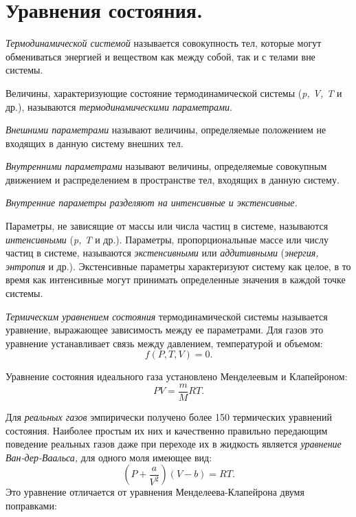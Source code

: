 \chapter{Уравнения состояния.} \label{equationOfState}

\emph{Термодинамической системой} называется совокупность тел, которые
могут обмениваться энергией и веществом как между собой, так и с телами
вне системы.

Величины, характеризующие состояние термодинамической системы (\emph{p,
V, T} и др.), называются \emph{термодинамическими параметрами}.

\emph{Внешними параметрами} называют величины, определяемые положением
не входящих в данную систему внешних тел.

\emph{Внутренними параметрами} называют величины, определяемые
совокупным движением и распределением в пространстве тел, входящих в
данную систему.

\emph{Внутренние параметры разделяют на интенсивные и экстенсивные.}

Параметры, не зависящие от массы или числа частиц в системе, называются
\emph{интенсивными} (\emph{p, T} и др.). Параметры, пропорциональные массе или числу частиц в системе, называются \emph{экстенсивными} или \emph{аддитивными} (\emph{энергия, энтропия} и др.). Экстенсивные параметры характеризуют систему как целое, в то время как интенсивные могут принимать определенные значения в каждой точке системы.

\emph{Термическим уравнением состояния} термодинамической системы называется уравнение, выражающее зависимость между ее параметрами. Для газов это уравнение устанавливает связь между давлением, температурой и объемом:
\begin{equation}
  f(P,T,V) = 0.
\end{equation}

Уравнение состояния идеального газа установлено Менделеевым и Клапейроном:
\begin{equation}
  PV = \frac{m}{M}RT.
\end{equation}

Для \emph{реальных газов} эмпирически получено более 150 термических уравнений состояния. Наиболее простым их них и качественно правильно передающим поведение реальных газов даже при переходе их в жидкость является \emph{уравнение Ван-дер-Ваальса,} для одного моля имеющее вид:
\begin{equation}
  \left (P+\frac{a}{V^2}\right )(V-b)= RT.
\end{equation}
Это уравнение отличается от уравнения Менделеева-Клапейрона двумя поправками:

